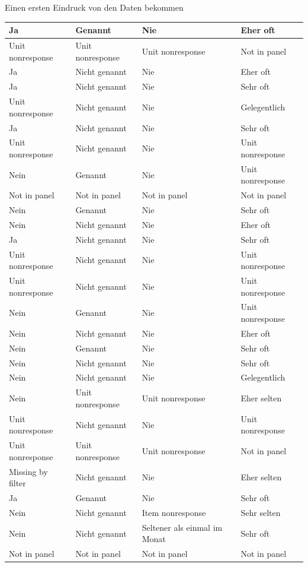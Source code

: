 \documentclass[ignorenonframetext,]{beamer}
\begin{document}
\begin{frame}{Einen ersten Eindruck von den Daten bekommen}
\begin{tabular}{l|l|l|l}
\hline
Ja & Genannt & Nie & Eher oft\\
\hline
Unit nonresponse & Unit nonresponse & Unit nonresponse & Not in panel\\
\hline
Ja & Nicht genannt & Nie & Eher oft\\
\hline
Ja & Nicht genannt & Nie & Sehr oft\\
\hline
Unit nonresponse & Nicht genannt & Nie & Gelegentlich\\
\hline
Ja & Nicht genannt & Nie & Sehr oft\\
\hline
Unit nonresponse & Nicht genannt & Nie & Unit nonresponse\\
\hline
Nein & Genannt & Nie & Unit nonresponse\\
\hline
Not in panel & Not in panel & Not in panel & Not in panel\\
\hline
Nein & Genannt & Nie & Sehr oft\\
\hline
Nein & Nicht genannt & Nie & Eher oft\\
\hline
Ja & Nicht genannt & Nie & Sehr oft\\
\hline
Unit nonresponse & Nicht genannt & Nie & Unit nonresponse\\
\hline
Unit nonresponse & Nicht genannt & Nie & Unit nonresponse\\
\hline
Nein & Genannt & Nie & Unit nonresponse\\
\hline
Nein & Nicht genannt & Nie & Eher oft\\
\hline
Nein & Genannt & Nie & Sehr oft\\
\hline
Nein & Nicht genannt & Nie & Sehr oft\\
\hline
Nein & Nicht genannt & Nie & Gelegentlich\\
\hline
Nein & Unit nonresponse & Unit nonresponse & Eher selten\\
\hline
Unit nonresponse & Nicht genannt & Nie & Unit nonresponse\\
\hline
Unit nonresponse & Unit nonresponse & Unit nonresponse & Not in panel\\
\hline
Missing by filter & Nicht genannt & Nie & Eher selten\\
\hline
Ja & Genannt & Nie & Sehr oft\\
\hline
Nein & Nicht genannt & Item nonresponse & Sehr selten\\
\hline
Nein & Nicht genannt & Seltener als einmal im Monat & Sehr oft\\
\hline
Not in panel & Not in panel & Not in panel & Not in panel\\
\hline

\end{tabular}
\end{frame}
\end{document}
